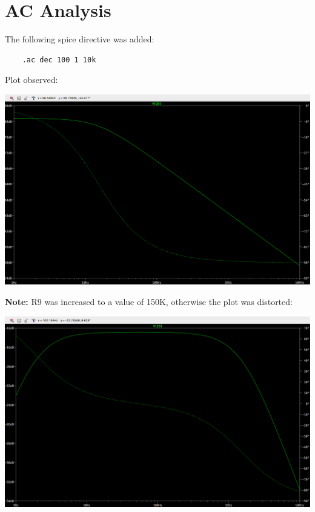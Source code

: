 \documentclass[11pt]{article}
\begin{document}
\pagebreak

\section{AC Analysis}
The following spice directive was added:

\begin{verbatim}
    .ac dec 100 1 10k
\end{verbatim}

Plot observed:
\newline

\includegraphics[width=\textwidth]{AC_150.png}

\newpage

\textbf{Note:} R9 was increased to a value of 150K, otherwise the plot was distorted:
\newline

\includegraphics[width=\textwidth]{AC_50.png}
\end{document}
